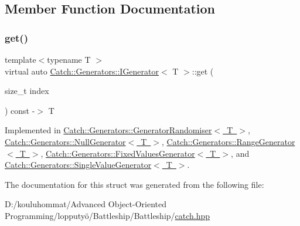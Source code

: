 \subsection{Member Function Documentation}
\mbox{\label{struct_catch_1_1_generators_1_1_i_generator_a737a89eb0bff02e580e36c59fb0d1171}} 
\subsubsection{\texorpdfstring{get()}{get()}}
{\footnotesize\ttfamily template$<$typename T $>$ \\
virtual auto \mbox{\hyperlink{struct_catch_1_1_generators_1_1_i_generator}{Catch\+::\+Generators\+::\+I\+Generator}}$<$ T $>$\+::get (\begin{DoxyParamCaption}\item[{size\+\_\+t}]{index }\end{DoxyParamCaption}) const -\/$>$  T\hspace{0.3cm}{\ttfamily [pure virtual]}}



Implemented in \mbox{\hyperlink{class_catch_1_1_generators_1_1_generator_randomiser_a4ad5de15865727bdaa638863e0969ab4}{Catch\+::\+Generators\+::\+Generator\+Randomiser$<$ T $>$}}, \mbox{\hyperlink{struct_catch_1_1_generators_1_1_null_generator_a17a2cc82d644e97afded4017c7a062ef}{Catch\+::\+Generators\+::\+Null\+Generator$<$ T $>$}}, \mbox{\hyperlink{class_catch_1_1_generators_1_1_range_generator_a78f7f624b7545823d1a683ebf2ac00e7}{Catch\+::\+Generators\+::\+Range\+Generator$<$ T $>$}}, \mbox{\hyperlink{class_catch_1_1_generators_1_1_fixed_values_generator_a3ed654a5860c170dbe7b01487b83253d}{Catch\+::\+Generators\+::\+Fixed\+Values\+Generator$<$ T $>$}}, and \mbox{\hyperlink{class_catch_1_1_generators_1_1_single_value_generator_ad03af3fe263136425595bfd2eec84209}{Catch\+::\+Generators\+::\+Single\+Value\+Generator$<$ T $>$}}.



The documentation for this struct was generated from the following file\+:\begin{DoxyCompactItemize}
\item 
D\+:/kouluhommat/\+Advanced Object-\/\+Oriented Programming/lopputyö/\+Battleship/\+Battleship/\mbox{\hyperlink{catch_8hpp}{catch.\+hpp}}\end{DoxyCompactItemize}
